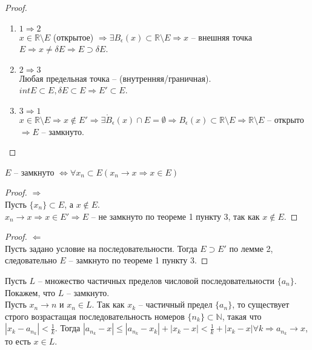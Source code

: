 \begin{proof}
    \begin{enumerate}
        \item $1 \Rightarrow 2$\\
        $x \in \mathds{R} \setminus E$ (открытое) $\Rightarrow \exists B_{\epsilon}(x) \subset \mathds{R} \setminus E \Rightarrow x$ -- внешняя точка $E \Rightarrow x \neq \delta E \Rightarrow E \supset \delta E$.
        \item $2 \Rightarrow 3$\\
        Любая предельная точка -- (внутренняя/граничная). $intE \subset E, \delta E \subset E \Rightarrow E' \subset E$.
        \item $3 \Rightarrow 1$\\
        $x \in \mathds{R} \setminus E \Rightarrow x \notin E' \Rightarrow \exists \mathring{B}_{\epsilon}(x) \cap E = \emptyset \Rightarrow B_{\epsilon}(x) \subset \mathds{R} \setminus E \Rightarrow \mathds{R} \setminus E$ -- открыто $\Rightarrow E$ -- замкнуто.
    \end{enumerate}
\end{proof}

\begin{corollary}
    $E$ -- замкнуто $\iff \forall {x_{n}} \subset E (x_{n} \to x \Rightarrow x \in E)$
\end{corollary}

\begin{proof} $\Rightarrow$\\
    Пусть $\{x_{n}\} \subset E$, а $x \notin E$.\\
    $x_{n} \to x \Rightarrow x \in E' \Rightarrow E$ -- не замкнуто по теореме 1 пункту 3, так как $x \notin E$.
\end{proof}

\begin{proof} $\Leftarrow$\\
    Пусть задано условие на последовательности. Тогда $E \supset E'$ по лемме 2, следовательно $E$ -- замкнуто по теореме 1 пункту 3.
\end{proof}

\begin{example}
    Пусть $L$ -- множество частичных пределов числовой последовательности $\{a_{n}\}$.
    Покажем, что $L$ -- замкнуто.\\
    Пусть $x_{n} \to n$ и $x_{n} \in L$. Так как $x_{k}$ -- частичный предел $\{a_{n}\}$, то существует строго возрастащая последовательность номеров $\{n_{k}\} \subset \mathds{N}$, такая что $|x_{k} - a_{n_{k}}| < \frac{1}{k}$. Тогда $|a_{n_{k}} - x| \leq |a_{n_k} - x_k| + |x_k - x| < \frac{1}{k} + |x_k - x| \forall k \Rightarrow a_{n_k} \to x$, то есть $x \in L$.
\end{example}


